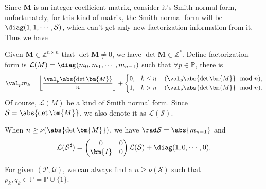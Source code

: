 
Since $\bm{M}$ is an integer coefficient matrix, consider it's Smith normal form, unfortunately, for this kind of matrix, the Smith normal form will be $\diag(1, 1, \cdots, \mathcal{S})$, which can't get anly new factorization information from it. Thus we have
\begin{definition}
	Given $\bm{M}\in \mathbb{Z}^{n\times n}$ that $\det\bm{M} \ne 0$, we have $\det\bm{M} \in\mathbb{Z}^{*}$. Define factorization form is $\mathcal{L}(M) = \diag(m_0, m_1, \cdots, m_{n-1})$ such that $\forall p\in\mathbb{P}$, there is
	\[ \val_{p}m_k = \left\lfloor\frac{\val_{p}\abs{\det\bm{M}}}{n}\right\rfloor + \left\{\begin{aligned}
		& 0, && k \le n - (\val_{p}\abs{\det\bm{M}} \mod{n}), \\
		& 1, && k > n - (\val_{p}\abs{\det\bm{M}} \mod{n}).
	\end{aligned}\right. \]
	Of course, $\mathcal{L}(M)$ be a kind of Smith normal form. Since $\mathcal{S} = \abs{\det\bm{M}}$, we also denote it as $\mathcal{L}(\mathcal{S})$.
\end{definition}
\begin{proposition}
	When $n \ge \nu(\abs{\det\bm{M}})$, we have $\rad\mathcal{S} = \abs{m_{n-1}}$ and 
	\[ \mathcal{L}(\mathcal{S}^{\sharp}) = \begin{pmatrix}
		0 & 0 \\
		\bm{I} & 0 \\
	\end{pmatrix}\mathcal{L}(\mathcal{S}) + \diag(1, 0, \cdots, 0). \]
\end{proposition}
For given $(\mathcal{P}, \mathcal{Q})$, we can always find a $n\ge\nu(\mathcal{S})$ such that $p_k, q_k \in\overline{\mathbb{P}} = \mathbb{P}\cup\{1\}$.

